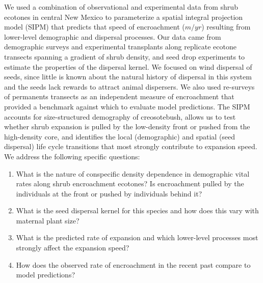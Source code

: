 \documentclass[11pt]{article}\usepackage[]{graphicx}\usepackage[usenames,dvipsnames]{xcolor}
\begin{document}
We used a combination of observational and experimental data from shrub ecotones in central New Mexico to parameterize a spatial integral projection model (SIPM) that predicts that speed of encroachment ($m/yr$) resulting from lower-level demographic and dispersal processes. 
Our data came from demographic surveys and experimental transplants along replicate ecotone transects spanning a gradient of shrub density, and seed drop experiments to estimate the properties of the dispersal kernel.
We focused on wind dispersal of seeds, since little is known about the natural history of dispersal in this system and the seeds lack rewards to attract animal dispersers.
We also used re-surveys of permanents transects as an independent measure of encroachment that provided a benchmark against which to evaluate model predictions. 
The SIPM accounts for size-structured demography of creosotebush, allows us to test whether shrub expansion is pulled by the low-density front or pushed from the high-density core, and identifies the local (demographic) and spatial (seed dispersal) life cycle transitions that most strongly contribute to expansion speed. 
We address the following specific questions: 
\begin{enumerate}
\item What is the nature of conspecific density dependence in demographic vital rates along shrub encroachment ecotones? Is encroachment pulled by the individuals at the front or pushed by individuals behind it?
\item What is the seed dispersal kernel for this species and how does this vary with maternal plant size?
\item What is the predicted rate of expansion and which lower-level processes most strongly affect the expansion speed?
\item How does the observed rate of encroachment in the recent past compare to model predictions?

\end{enumerate}
\end{document}
